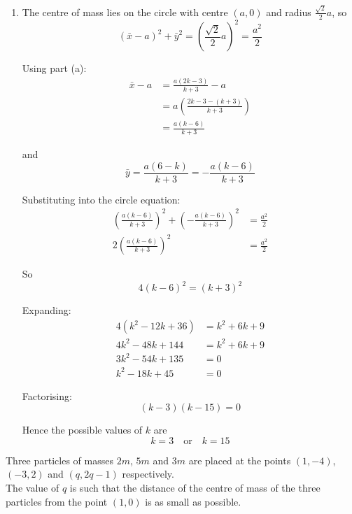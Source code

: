\documentclass[leqno]{article}
\begin{document}
\begin{enumerate}[
  label=\textbf{\arabic*.},
  leftmargin=*,
  topsep=0pt,
  partopsep=0pt,
  parsep=0pt
]
\begin{djsSolution}
\begin{enumerate}[label=\textbf{(\alph*)}, start=1]
\begin{enumerate}[label=\textbf{(\roman*)}, start=1]
    Hence
    \[
    \bar{y}=\frac{a(6-k)}{k+3}
    \]
  \end{enumerate}

  \item The centre of mass lies on the circle with centre $(a,0)$ and radius $\frac{\sqrt{2}}{2}a$, so
  \[
  (\bar{x}-a)^2+\bar{y}^2=\left(\frac{\sqrt{2}}{2}a\right)^2=\frac{a^2}{2}
  \]

  Using part (a):
  \begin{align*}
  \bar{x}-a &= \frac{a(2k-3)}{k+3}-a \\
  &= a\left(\frac{2k-3-(k+3)}{k+3}\right) \\
  &= \frac{a(k-6)}{k+3}
  \end{align*}

  and
  \[
  \bar{y}=\frac{a(6-k)}{k+3}=-\frac{a(k-6)}{k+3}
  \]

  Substituting into the circle equation:
  \begin{align*}
  \left(\frac{a(k-6)}{k+3}\right)^2+\left(-\frac{a(k-6)}{k+3}\right)^2 &= \frac{a^2}{2} \\
  2\left(\frac{a(k-6)}{k+3}\right)^2 &= \frac{a^2}{2}
  \end{align*}

  So
  \[
  4(k-6)^2=(k+3)^2
  \]

  Expanding:
  \begin{align*}
  4(k^2-12k+36) &= k^2+6k+9 \\
  4k^2-48k+144 &= k^2+6k+9 \\
  3k^2-54k+135 &= 0 \\
  k^2-18k+45 &= 0
  \end{align*}

  Factorising:
  \[
  (k-3)(k-15)=0
  \]

  Hence the possible values of $k$ are
  \[
  k=3 \quad \text{or} \quad k=15
  \]
\end{enumerate}
\end{djsSolution}


\newpage

\questionitem

Three particles of masses $2m$, $5m$ and $3m$ are placed at the points $(1, -4)$, $(-3, 2)$ and $(q, 2q - 1)$ respectively. \\

The value of $q$ is such that the distance of the centre of mass of the three particles from the point $(1, 0)$ is as small as possible. \\


\end{enumerate}
\end{document}
